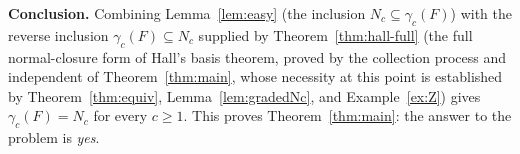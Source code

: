 \documentclass{amsart}
\theoremstyle{definition}
\theoremstyle{remark}
\begin{document}
\bigskip
\noindent\textbf{Conclusion.}
Combining Lemma~\ref{lem:easy} (the inclusion $N_c\subseteq\gamma_c(F)$) with the
reverse inclusion $\gamma_c(F)\subseteq N_c$ supplied by
Theorem~\ref{thm:hall-full} (the full normal-closure form of Hall's basis theorem,
proved by the collection process and independent of Theorem~\ref{thm:main}, whose
necessity at this point is established by Theorem~\ref{thm:equiv},
Lemma~\ref{lem:gradedNc}, and Example~\ref{ex:Z}) gives
$\gamma_c(F)=N_c$ for every $c\ge1$. This proves Theorem~\ref{thm:main}: the answer
to the problem is \emph{yes}.
\end{document}
